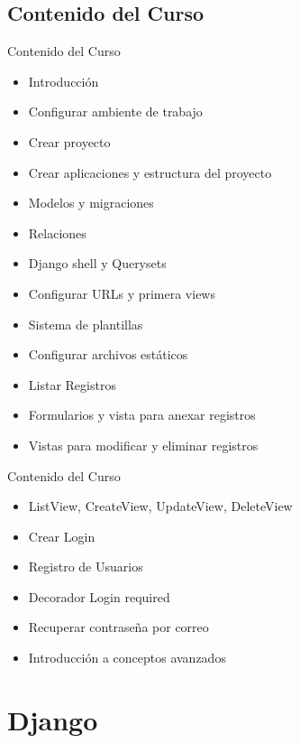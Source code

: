 \documentclass[xcolor=dvipsnames]{beamer}
\begin{document}
\subsection{Contenido del Curso}
\begin{frame}
\begin{block}{Contenido del Curso}
\begin{itemize}
\item 
Introducción
\item 
Configurar ambiente de trabajo
\item 
Crear proyecto
\item 
Crear aplicaciones y estructura del proyecto
\item 
Modelos y migraciones
\item 
Relaciones
\item 
Django shell y Querysets
\item 
Configurar URLs y primera views
\item 
Sistema de plantillas
\item 
Configurar archivos estáticos
\item 
Listar Registros
\item 
Formularios y vista para anexar registros
\item 
Vistas para modificar y eliminar registros
\end{itemize}
\end{block}
\end{frame}


\begin{frame}
\begin{block}{Contenido del Curso}
\begin{itemize}
\item
ListView, CreateView, UpdateView, DeleteView   
\item
Crear Login
\item
Registro de Usuarios
\item
Decorador Login required
\item
Recuperar contraseña por correo
\item
Introducción a conceptos avanzados
\end{itemize}
\end{block}
\end{frame}



\section{Django}
\end{document}
